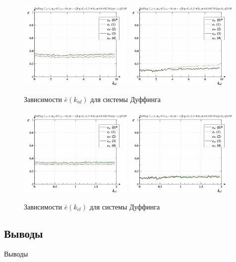 \begin{figure}[ht!]
\begin{center}
  \includegraphics[width=0.49\textwidth]{p/cha/duff/duff_id-p_k_nl_sign.png}
  \hfill
  \includegraphics[width=0.49\textwidth]{p/cha/duff/duff_id-p_k_nl_sin.png}
\end{center}
  \caption{Зависимости $\bar{e}(k_{nl})$ для системы Дуффинга}
\label{atu:f:duff_e_k_nl}
\end{figure}

\begin{figure}[ht!]
\begin{center}
  \includegraphics[width=0.49\textwidth]{p/cha/duff/duff_id-p_k_cl_sign.png}
  \hfill
  \includegraphics[width=0.49\textwidth]{p/cha/duff/duff_id-p_k_cl_sin.png}
\end{center}
  \caption{Зависимости $\bar{e}(k_{cl})$ для системы Дуффинга}
\label{atu:f:duff_e_k_cl}
\end{figure}



\subsection{Выводы}  %

Выводы



